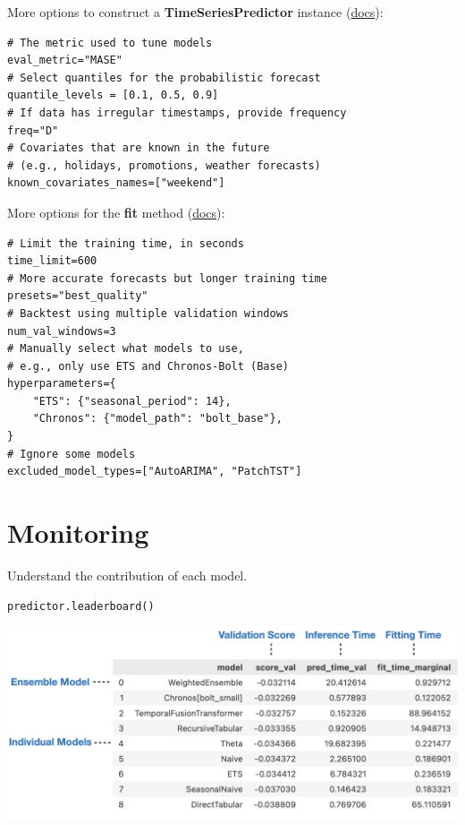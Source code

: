More options to construct a \textbf{TimeSeriesPredictor} instance (\href{https://auto.gluon.ai/stable/api/autogluon.timeseries.TimeSeriesPredictor.html}{docs}):

\begin{verbatim}
# The metric used to tune models
eval_metric="MASE"
# Select quantiles for the probabilistic forecast
quantile_levels = [0.1, 0.5, 0.9]
# If data has irregular timestamps, provide frequency
freq="D"
# Covariates that are known in the future
# (e.g., holidays, promotions, weather forecasts)
known_covariates_names=["weekend"]
\end{verbatim}
More options for the \textbf{fit} method (\href{https://auto.gluon.ai/stable/api/autogluon.timeseries.TimeSeriesPredictor.fit.html}{docs}):

\begin{verbatim}
# Limit the training time, in seconds
time_limit=600
# More accurate forecasts but longer training time
presets="best_quality"
# Backtest using multiple validation windows
num_val_windows=3
# Manually select what models to use,
# e.g., only use ETS and Chronos-Bolt (Base)
hyperparameters={
    "ETS": {"seasonal_period": 14},
    "Chronos": {"model_path": "bolt_base"},
}
# Ignore some models
excluded_model_types=["AutoARIMA", "PatchTST"]
\end{verbatim}



\section*{Monitoring}
Understand the contribution of each model.

\begin{verbatim}
predictor.leaderboard()
\end{verbatim}

\includegraphics[width=\linewidth]{timeseries/images/leaderboardv1.2-medium_quality.png}

